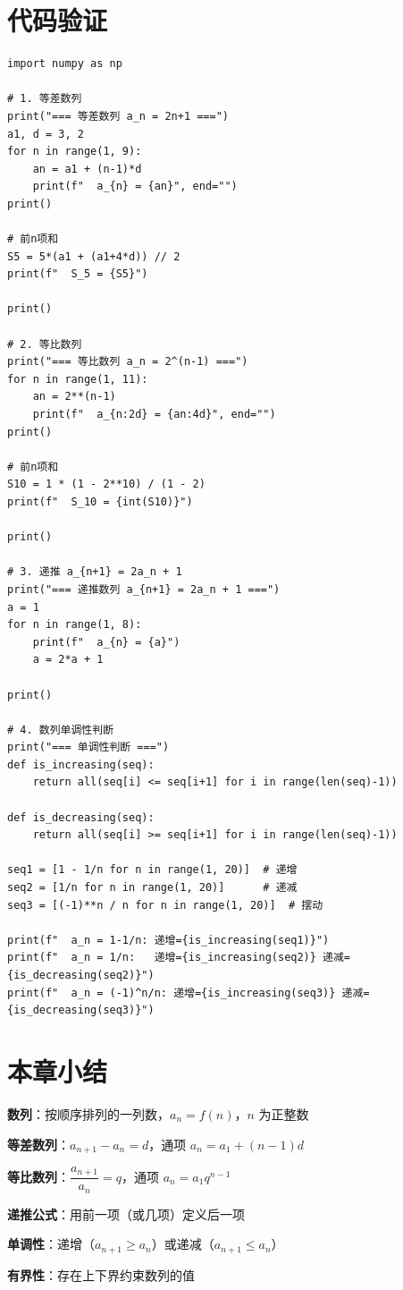 \section{代码验证}

\begin{lstlisting}[caption=数列的数值验证]
import numpy as np

# 1. 等差数列
print("=== 等差数列 a_n = 2n+1 ===")
a1, d = 3, 2
for n in range(1, 9):
    an = a1 + (n-1)*d
    print(f"  a_{n} = {an}", end="")
print()

# 前n项和
S5 = 5*(a1 + (a1+4*d)) // 2
print(f"  S_5 = {S5}")

print()

# 2. 等比数列
print("=== 等比数列 a_n = 2^(n-1) ===")
for n in range(1, 11):
    an = 2**(n-1)
    print(f"  a_{n:2d} = {an:4d}", end="")
print()

# 前n项和
S10 = 1 * (1 - 2**10) / (1 - 2)
print(f"  S_10 = {int(S10)}")

print()

# 3. 递推 a_{n+1} = 2a_n + 1
print("=== 递推数列 a_{n+1} = 2a_n + 1 ===")
a = 1
for n in range(1, 8):
    print(f"  a_{n} = {a}")
    a = 2*a + 1

print()

# 4. 数列单调性判断
print("=== 单调性判断 ===")
def is_increasing(seq):
    return all(seq[i] <= seq[i+1] for i in range(len(seq)-1))

def is_decreasing(seq):
    return all(seq[i] >= seq[i+1] for i in range(len(seq)-1))

seq1 = [1 - 1/n for n in range(1, 20)]  # 递增
seq2 = [1/n for n in range(1, 20)]      # 递减
seq3 = [(-1)**n / n for n in range(1, 20)]  # 摆动

print(f"  a_n = 1-1/n: 递增={is_increasing(seq1)}")
print(f"  a_n = 1/n:   递增={is_increasing(seq2)} 递减={is_decreasing(seq2)}")
print(f"  a_n = (-1)^n/n: 递增={is_increasing(seq3)} 递减={is_decreasing(seq3)}")
\end{lstlisting}


\section{本章小结}

\begin{progressbox}
\textbf{数列}：按顺序排列的一列数，\(a_n = f(n)\)，\(n\) 为正整数

\textbf{等差数列}：\(a_{n+1} - a_n = d\)，通项 \(a_n = a_1 + (n-1)d\)

\textbf{等比数列}：\(\dfrac{a_{n+1}}{a_n} = q\)，通项 \(a_n = a_1 q^{n-1}\)

\textbf{递推公式}：用前一项（或几项）定义后一项

\textbf{单调性}：递增（\(a_{n+1} \ge a_n\)）或递减（\(a_{n+1} \le a_n\)）

\textbf{有界性}：存在上下界约束数列的值
\end{progressbox}

